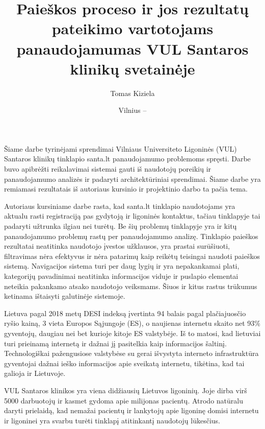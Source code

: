 \documentclass{VUMIFPSkursinis}
\title{Paieškos proceso ir jos rezultatų pateikimo vartotojams panaudojamumas VUL Santaros klinikų svetainėje}
\author{Tomas Kiziela}
\date{Vilnius – \the\year}
\begin{document}
	
\maketitle
\cleardoublepage{}
\setcounter{page}{2}

\tableofcontents




Šiame darbe tyrinėjami sprendimai Vilniaus Universiteto Ligoninės (VUL) Santaros klinikų tinklapio santa.lt panaudojamumo problemoms spręsti. Darbe buvo apibrėžti reikalavimai sistemai gauti iš naudotojų poreikių ir panaudojamumo analizės ir padaryti architektūriniai sprendimai. Šiame darbe yra remiamasi rezultatais iš autoriaus kursinio ir projektinio darbo ta pačia tema\cite{Kursinis, Projektinis}.

Autoriaus kursiniame darbe rasta, kad santa.lt tinklapio naudotojams yra aktualu rasti registraciją pas gydytoją ir ligoninės kontaktus, tačiau tinklapyje tai padaryti užtrunka ilgiau nei turėtų. Be šių problemų tinklapyje yra ir kitų panaudojamumo problemų rastų per panaudojamumo analizę. Tinklapio paieškos rezultatai neatitinka naudotojo įvestos užklausos, yra prastai surūšiuoti, filtravimas nėra efektyvus ir nėra patarimų kaip reikėtų teisingai naudoti paieškos sistemą. Navigacijos sistema turi per daug lygių ir yra nepakankamai plati, kategorijų pavadinimai neatitinka informacijos viduje ir puslapio elementai neteikia pakankamo atsako naudotojo veiksmams. Šiuos ir kitus rastus trūkumus ketinama ištaisyti galutinėje sistemoje.

Lietuva pagal 2018 metų DESI indeksą įvertinta 94 balais pagal plačiajuosčio ryšio kainą, 3 vieta Europos Sąjungoje (ES), o naujienas internetu skaito net 93\% gyventojų, daugiau nei bet kurioje kitoje ES valstybėje\cite{InternetasLt}. Iš to matosi, kad lietuviai turi prieinamą internetą ir dažnai jį pasitelkia kaip informacijos šaltinį. Technologiškai pažengusiose valstybėse su gerai išvystyta interneto infrastruktūra gyventojai dažnai ieško informacijos apie sveikatą internetu\cite{InternetUseByPublicSAEn}\cite{InternetUseByPublicHKEn}, tikėtina, kad tai galioja ir Lietuvoje.

VUL Santaros klinikos yra viena didžiausių Lietuvos ligoninių. Joje dirba virš 5000 darbuotojų ir kasmet gydoma apie milijonas pacientų\cite{VulSkApieMusLt}. Atrodo natūralu daryti prielaidą, kad nemažai pacientų ir lankytojų apie ligoninę domisi internetu ir ligoninei yra svarbu turėti tinklapį atitinkantį naudotojų lūkesčius.
\end{document}
